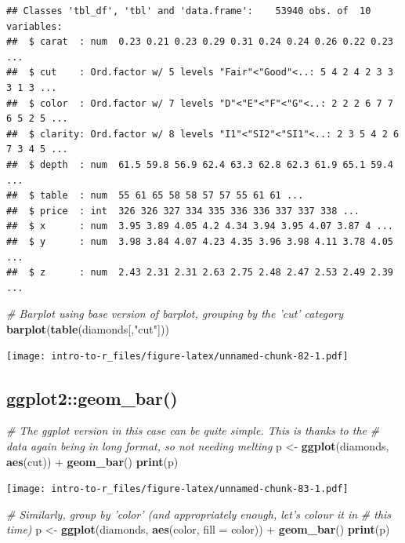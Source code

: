 \documentclass[a4paper]{book}
\newenvironment{Shaded}{\begin{snugshade}}{\end{snugshade}}
\newcommand{\KeywordTok}[1]{\textcolor[rgb]{0.13,0.29,0.53}{\textbf{{#1}}}}
\newcommand{\DataTypeTok}[1]{\textcolor[rgb]{0.13,0.29,0.53}{{#1}}}
\newcommand{\StringTok}[1]{\textcolor[rgb]{0.31,0.60,0.02}{{#1}}}
\newcommand{\CommentTok}[1]{\textcolor[rgb]{0.56,0.35,0.01}{\textit{{#1}}}}
\newcommand{\NormalTok}[1]{{#1}}
\renewenvironment{Shaded}
{\vspace{1.5em}\begin{leftbar}\begin{snugshade}}
{\end{snugshade}\end{leftbar}\vspace{3pt}}
\begin{document}
\begin{verbatim}
## Classes 'tbl_df', 'tbl' and 'data.frame':    53940 obs. of  10 variables:
##  $ carat  : num  0.23 0.21 0.23 0.29 0.31 0.24 0.24 0.26 0.22 0.23 ...
##  $ cut    : Ord.factor w/ 5 levels "Fair"<"Good"<..: 5 4 2 4 2 3 3 3 1 3 ...
##  $ color  : Ord.factor w/ 7 levels "D"<"E"<"F"<"G"<..: 2 2 2 6 7 7 6 5 2 5 ...
##  $ clarity: Ord.factor w/ 8 levels "I1"<"SI2"<"SI1"<..: 2 3 5 4 2 6 7 3 4 5 ...
##  $ depth  : num  61.5 59.8 56.9 62.4 63.3 62.8 62.3 61.9 65.1 59.4 ...
##  $ table  : num  55 61 65 58 58 57 57 55 61 61 ...
##  $ price  : int  326 326 327 334 335 336 336 337 337 338 ...
##  $ x      : num  3.95 3.89 4.05 4.2 4.34 3.94 3.95 4.07 3.87 4 ...
##  $ y      : num  3.98 3.84 4.07 4.23 4.35 3.96 3.98 4.11 3.78 4.05 ...
##  $ z      : num  2.43 2.31 2.31 2.63 2.75 2.48 2.47 2.53 2.49 2.39 ...
\end{verbatim}

\begin{Shaded}
\begin{Highlighting}[]
\CommentTok{# Barplot using base version of barplot, grouping by the 'cut' category}
\KeywordTok{barplot}\NormalTok{(}\KeywordTok{table}\NormalTok{(diamonds[,}\StringTok{"cut"}\NormalTok{]))}
\end{Highlighting}
\end{Shaded}

\texttt{[image: intro-to-r\_files/figure-latex/unnamed-chunk-82-1.pdf]}

\subsection{ggplot2::geom\_bar()}\label{ggplot2geom_bar}

\begin{Shaded}
\begin{Highlighting}[]
\CommentTok{# The ggplot version in this case can be quite simple. This is thanks to the}
\CommentTok{# data again being in long format, so not needing melting}
\NormalTok{p <-}\StringTok{ }\KeywordTok{ggplot}\NormalTok{(diamonds, }\KeywordTok{aes}\NormalTok{(cut)) +}\StringTok{ }\KeywordTok{geom_bar}\NormalTok{()}
\KeywordTok{print}\NormalTok{(p)}
\end{Highlighting}
\end{Shaded}

\texttt{[image: intro-to-r\_files/figure-latex/unnamed-chunk-83-1.pdf]}

\begin{Shaded}
\begin{Highlighting}[]
\CommentTok{# Similarly, group by 'color' (and appropriately enough, let's colour it in}
\CommentTok{# this time)}
\NormalTok{p <-}\StringTok{ }\KeywordTok{ggplot}\NormalTok{(diamonds, }\KeywordTok{aes}\NormalTok{(color, }\DataTypeTok{fill =} \NormalTok{color)) +}\StringTok{ }\KeywordTok{geom_bar}\NormalTok{()}
\KeywordTok{print}\NormalTok{(p)}
\end{Highlighting}
\end{Shaded}
\end{document}

